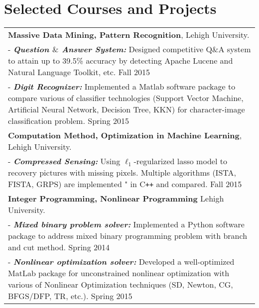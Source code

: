 \documentclass[letters,11pt]{article} %
\begin{document}
\section{Selected Courses and Projects}
\begin{tabular}{p{17.5cm}}
    \textbf{Massive Data Mining, Pattern Recognition}, Lehigh University.\\
    \footnotesize{- \textbf{\emph{Question $\&$ Answer System:}} Designed competitive Q$\mbox{\&}$A system to attain up to 39.5\% accuracy by detecting Apache Lucene and Natural Language Toolkit, etc. \hfill{Fall 2015}}\\
\footnotesize{- \textbf{\emph{Digit Recognizer:}} Implemented a Matlab software package to compare various of classifier technologies (Support Vector Machine, Artificial Neural Network, Decision Tree, KKN) for character-image classification problem.} \hfill{Spring 2015}\\ 
\textbf{Computation Method, Optimization in Machine Learning}, Lehigh University. \\ 
\footnotesize{- \textbf{\emph{Compressed Sensing:}} Using $\ell_1$-regularized lasso model to recovery pictures with missing pixels. Multiple algorithms (ISTA, FISTA, GRPS) are implemented " in C\texttt{++} and compared.} \hfill{Fall 2015}\\ 
\textbf{Integer Programming, Nonlinear Programming} Lehigh University.\\ 
\footnotesize{- \textbf{\emph{Mixed binary problem solver:}} Implemented a Python software package to address mixed binary programming problem with branch and cut method.} \hfill{Spring 2014}\\ 
\footnotesize{- \textbf{\emph{Nonlinear optimization solver:}} Developed a well-optimized MatLab package for unconstrained nonlinear optimization with various of Nonlinear Optimization techniques (SD, Newton, CG, BFGS/DFP, TR, etc.).} \hfill{Spring 2015}\\ 
\end{tabular}
\end{document}
